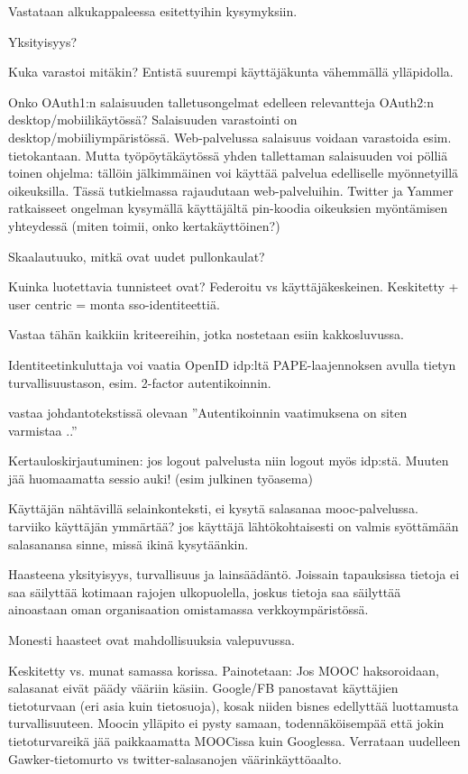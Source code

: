 \documentclass[finnish,gradu]{tktltiki}
\begin{document}
  Vastataan alkukappaleessa esitettyihin kysymyksiin.

  Yksityisyys? %

  Kuka varastoi mitäkin? Entistä suurempi käyttäjäkunta vähemmällä ylläpidolla.

  Onko OAuth1:n salaisuuden talletusongelmat edelleen relevantteja OAuth2:n desktop/mobiilikäytössä?
  Salaisuuden varastointi on desktop/mobiiliympäristössä. Web-palvelussa salaisuus voidaan varastoida esim. tietokantaan. Mutta työpöytäkäytössä yhden tallettaman salaisuuden voi pölliä toinen ohjelma: tällöin jälkimmäinen voi käyttää palvelua edelliselle myönnetyillä oikeuksilla. Tässä tutkielmassa rajaudutaan web-palveluihin. Twitter ja Yammer ratkaisseet ongelman kysymällä käyttäjältä pin-koodia oikeuksien myöntämisen yhteydessä (miten toimii, onko kertakäyttöinen?) %

  Skaalautuuko, mitkä ovat uudet pullonkaulat?

  Kuinka luotettavia tunnisteet ovat? Federoitu vs käyttäjäkeskeinen. Keskitetty + user centric = monta sso-identiteettiä.

  Vastaa tähän kaikkiin kriteereihin, jotka nostetaan esiin kakkosluvussa.

  Identiteetinkuluttaja voi vaatia OpenID idp:ltä PAPE-laajennoksen avulla tietyn turvallisuustason, esim. 2-factor autentikoinnin.

  vastaa johdantotekstissä olevaan ''Autentikoinnin vaatimuksena on siten varmistaa ..''

  Kertauloskirjautuminen: jos logout palvelusta niin logout myös idp:stä. Muuten jää huomaamatta sessio auki! (esim julkinen työasema)

  Käyttäjän nähtävillä selainkonteksti, ei kysytä salasanaa mooc-palvelussa. tarviiko käyttäjän ymmärtää? jos käyttäjä lähtökohtaisesti on valmis syöttämään salasanansa sinne, missä ikinä kysytäänkin.

  Haasteena yksityisyys, turvallisuus ja lainsäädäntö. Joissain tapauksissa tietoja ei saa säilyttää kotimaan rajojen ulkopuolella, joskus tietoja saa säilyttää ainoastaan oman organisaation omistamassa verkkoympäristössä.

  Monesti haasteet ovat mahdollisuuksia valepuvussa.

  Keskitetty vs. munat samassa korissa. Painotetaan: Jos MOOC haksoroidaan, salasanat eivät päädy vääriin käsiin. Google/FB panostavat käyttäjien tietoturvaan (eri asia kuin tietosuoja), kosak niiden bisnes edellyttää luottamusta turvallisuuteen. Moocin ylläpito ei pysty samaan, todennäköisempää että jokin tietoturvareikä jää paikkaamatta MOOCissa kuin Googlessa. Verrataan uudelleen Gawker-tietomurto vs twitter-salasanojen väärinkäyttöaalto.
\end{document}
